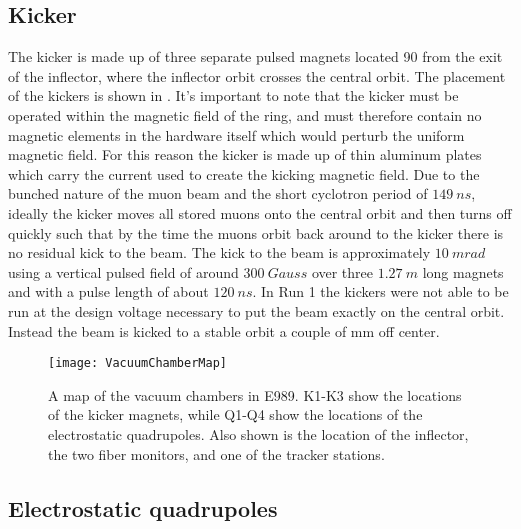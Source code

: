 \subsection{Kicker}

The kicker is made up of three separate pulsed magnets located 90\textdegree{} from the exit of the inflector, where the inflector orbit crosses the central orbit. The placement of the kickers is shown in . It's important to note that the kicker must be operated within the magnetic field of the ring, and must therefore contain no magnetic elements in the hardware itself which would perturb the uniform magnetic field. For this reason the kicker is made up of thin aluminum plates which carry the current used to create the kicking magnetic field. Due to the bunched nature of the muon beam and the short cyclotron period of $\SI{149}{ns}$, ideally the kicker moves all stored muons onto the central orbit and then turns off quickly such that by the time the muons orbit back around to the kicker there is no residual kick to the beam. The kick to the beam is approximately $\SI{10}{mrad}$ using a vertical pulsed field of around $\SI{300}{Gauss}$ over three $\SI{1.27}{m}$ long magnets and with a pulse length of about $\SI{120}{ns}$. In Run 1 the kickers were not able to be run at the design voltage necessary to put the beam exactly on the central orbit. Instead the beam is kicked to a stable orbit a couple of mm off center.  %

\begin{figure}[]
    \centering
    \texttt{[image: VacuumChamberMap]}
    \caption[Vacuum chamber map]{A map of the vacuum chambers in E989. K1-K3 show the locations of the kicker magnets, while Q1-Q4 show the locations of the electrostatic quadrupoles. Also shown is the location of the inflector, the two fiber monitors, and one of the tracker stations.}   
    \label{fig:vacmap}
\end{figure}

\subsection{Electrostatic quadrupoles}

